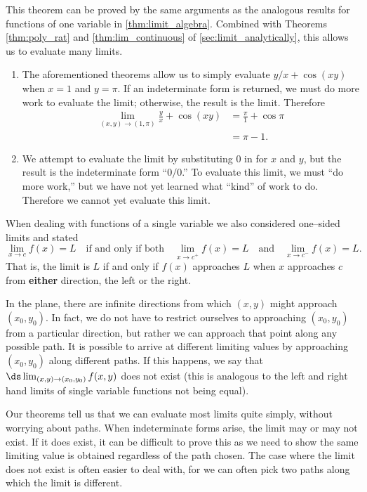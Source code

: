 This theorem can be proved by the same arguments as the analogous results for functions of one variable in \autoref{thm:limit_algebra}.  Combined with Theorems \ref{thm:poly_rat} and \ref{thm:lim_continuous} of \autoref{sec:limit_analytically}, this allows us to evaluate many limits.

{\begin{enumerate}
	\item The aforementioned theorems allow us to simply evaluate $y/x+\cos(xy)$ when $x=1$ and $y=\pi$. If an indeterminate form is returned, we must do more work to evaluate the limit; otherwise, the result is the limit. Therefore
	\begin{align*}
	\lim_{(x,y)\to (1,\pi)} \frac yx + \cos(xy)  &= \frac\pi{1}+\cos \pi \\
		&= \pi -1.
	\end{align*}
	\item		We attempt to evaluate the limit by substituting 0 in for $x$ and $y$, but the result is the indeterminate form ``$0/0$.'' To evaluate this limit, we must ``do more work,'' but we have not yet learned what ``kind'' of work to do. Therefore we cannot yet evaluate this limit.\eoehere
\end{enumerate}}

When dealing with functions of a single variable we also considered one--sided limits and stated
\[
\lim_{x\to c}f(x) = L
\quad\text{if and only if both}\quad
\lim_{x\to c^+}f(x) =L \quad\text{and}\quad \lim_{x\to c^-}f(x) =L.
\]
That is, the limit is $L$ if and only if $f(x)$ approaches $L$ when $x$ approaches $c$ from \textbf{either} direction, the left or the right.

In the plane, there are infinite directions from which $(x,y)$ might approach $(x_0,y_0)$. In fact, we do not have to restrict ourselves to approaching $(x_0,y_0)$ from a particular direction, but rather we can approach that point along any possible path. It is possible to arrive at different limiting values by approaching $(x_0,y_0)$ along different paths. If this happens, we say that $\ds \lim_{(x,y)\to(x_0,y_0) } f(x,y)$ does not exist (this is analogous to the left and right hand limits of single variable functions not being equal).

Our theorems tell us that we can evaluate most limits quite simply, without worrying about  paths. When indeterminate forms arise, the limit may or may not exist. If it does exist, it can be difficult to prove this as we need to show the same limiting value is obtained regardless of the path chosen. The case where the limit does not exist is often easier to deal with, for we can often pick two paths along which the limit is different.

